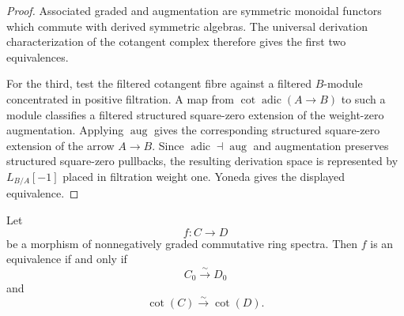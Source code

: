 \begin{proof}
Associated graded and augmentation are symmetric monoidal functors which
commute with derived symmetric algebras.  The universal derivation
characterization of the cotangent complex therefore gives the first two
equivalences.

For the third, test the filtered cotangent fibre against a filtered
$B$-module concentrated in positive filtration.  A map from
$\operatorname{cot}\operatorname{adic}(A\to B)$ to such a module classifies a
filtered structured square-zero extension of the weight-zero augmentation.
Applying $\operatorname{aug}$ gives the corresponding structured square-zero
extension of the arrow $A\to B$.  Since
$\operatorname{adic}\dashv\operatorname{aug}$ and augmentation preserves
structured square-zero pullbacks, the resulting derivation space is
represented by $L_{B/A}[-1]$ placed in filtration weight one.  Yoneda gives
the displayed equivalence.
\end{proof}

\begin{lemma}
\label{lem:bnla-graded-cotangent-detection}
Let
\[
    f:C\longrightarrow D
\]
be a morphism of nonnegatively graded commutative ring spectra.
Then $f$ is an equivalence if and only if
\[
    C_0\xrightarrow{\sim}D_0
\]
and
\[
    \operatorname{cot}(C)
    \xrightarrow{\sim}
    \operatorname{cot}(D).
\]
\end{lemma}

